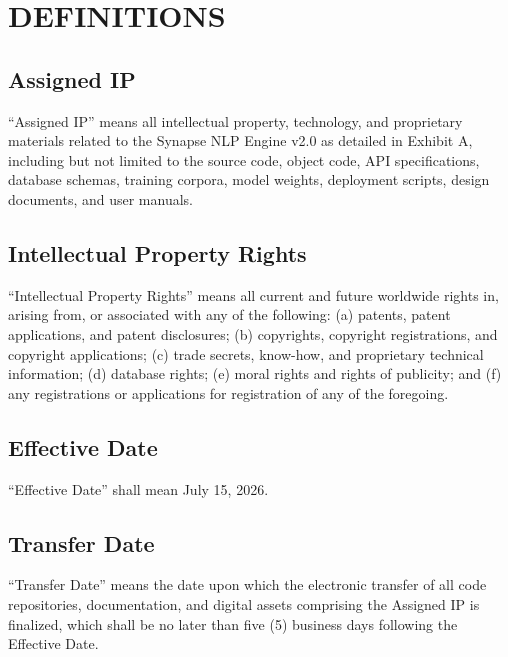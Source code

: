 \section{DEFINITIONS}

\subsection{Assigned IP}
``Assigned IP'' means all intellectual property, technology, and proprietary materials related to the Synapse NLP Engine v2.0 as detailed in Exhibit A, including but not limited to the source code, object code, API specifications, database schemas, training corpora, model weights, deployment scripts, design documents, and user manuals.

\subsection{Intellectual Property Rights}
``Intellectual Property Rights'' means all current and future worldwide rights in, arising from, or associated with any of the following: (a) patents, patent applications, and patent disclosures; (b) copyrights, copyright registrations, and copyright applications; (c) trade secrets, know-how, and proprietary technical information; (d) database rights; (e) moral rights and rights of publicity; and (f) any registrations or applications for registration of any of the foregoing.

\subsection{Effective Date}
``Effective Date'' shall mean July 15, 2026.

\subsection{Transfer Date}
``Transfer Date'' means the date upon which the electronic transfer of all code repositories, documentation, and digital assets comprising the Assigned IP is finalized, which shall be no later than five (5) business days following the Effective Date.
